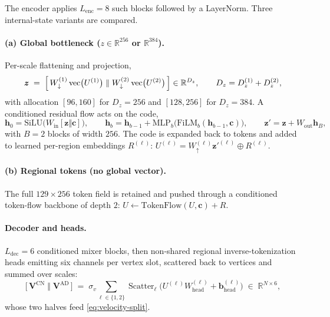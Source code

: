 \documentclass[11pt]{article}
\newcommand{\R}{\mathbb{R}}
\newcommand{\V}{\bm{V}}
\newcommand{\cond}{\bm{c}}
\begin{document}
The encoder applies $L_{\mathrm{enc}} = 8$ such blocks followed by a LayerNorm. Three
internal-state variants are compared.

\paragraph{(a) Global bottleneck ($z \in \R^{256}$ or $\R^{384}$).}
Per-scale flattening and projection,
\begin{equation}
  \bm{z} \;=\; \Bigl[\, W^{(1)}_{\downarrow} \operatorname{vec}\bigl(U^{(1)}\bigr)
  \;\Vert\; W^{(2)}_{\downarrow} \operatorname{vec}\bigl(U^{(2)}\bigr) \,\Bigr]
  \in \R^{D_z}, \qquad D_z = D_z^{(1)} + D_z^{(2)},
\end{equation}
with allocation $[96, 160]$ for $D_z = 256$ and $[128, 256]$ for $D_z = 384$. A conditioned
residual flow acts on the code,
\begin{equation}
  \bm{h}_0 = \mathrm{SiLU}\bigl( W_{\mathrm{in}} [\bm{z} \Vert \cond] \bigr),\qquad
  \bm{h}_{b} = \bm{h}_{b-1} + \mathrm{MLP}_b\bigl(\mathrm{FiLM}_b(\bm{h}_{b-1}, \cond)\bigr),\qquad
  \bm{z}' = \bm{z} + W_{\mathrm{out}} \bm{h}_{B},
\end{equation}
with $B = 2$ blocks of width $256$. The code is expanded back to tokens and added to learned
per-region embeddings $R^{(\ell)}$:
$U^{(\ell)} = W^{(\ell)}_{\uparrow} \bm{z}'^{(\ell)} \oplus R^{(\ell)}$.

\paragraph{(b) Regional tokens (no global vector).} The full $129 \times 256$ token field is
retained and pushed through a conditioned token-flow backbone of depth $2$:
$U \leftarrow \mathrm{TokenFlow}(U, \cond) + R$.

\paragraph{Decoder and heads.} $L_{\mathrm{dec}} = 6$ conditioned mixer blocks, then
non-shared regional inverse-tokenization heads emitting six channels per vertex slot,
scattered back to vertices and summed over scales:
\begin{equation}
  \bigl[\, \V^{\mathrm{CN}} \;\Vert\; \V^{\mathrm{AD}} \,\bigr]
  \;=\; \sigma_{v} \sum_{\ell \in \{1,2\}} \operatorname{Scatter}_\ell\!
  \bigl( U^{(\ell)} W^{(\ell)}_{\mathrm{head}} + \bm{b}^{(\ell)}_{\mathrm{head}} \bigr)
  \;\in\; \R^{N \times 6},
\end{equation}
whose two halves feed \eqref{eq:velocity-split}.
\end{document}
